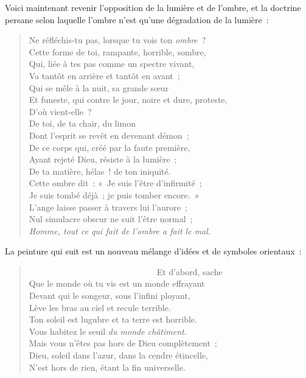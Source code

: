 \documentclass[french,twoside]{book} %
\begin{document}
\noindent Voici maintenant revenir l’opposition de la lumière et de l’ombre, et la doctrine persane selon laquelle l’ombre n’est qu’une dégradation de la lumière :\par


\begin{verse}
Ne réfléchis-tu pas, lorsque tu vois ton \emph{ombre} ?\\
Cette forme de toi, rampante, horrible, sombre,\\
Qui, liée à tes pas comme un spectre vivant,\\
Va tantôt en arrière et tantôt en avant ;\\
Qui se mêle à la nuit, sa grande sœur\\
Et funeste, qui contre le jour, noire et dure, proteste,\\
D’où vient-elle ?\\
De toi, de ta chair, du limon\\
Dont l’esprit se revêt en devenant démon ;\\
De ce corps qui, créé par la faute première,\\
Ayant rejeté Dieu, résiste à la lumière ;\\
De ta matière, hélas ! de ton iniquité.\\
Cette ombre dit : « Je suis l’être d’infirmité ;\\
Je suis tombé déjà ; je puis tomber encore. »\\
L’ange laisse passer à travers lui l’aurore ;\\
Nul simulacre obscur ne suit l’être normal ;\\
\emph{Homme, tout ce qui fait de l’ombre a fait le mal}.\\
\end{verse}

\noindent La peinture qui suit est un nouveau mélange d’idées et de symboles orientaux :\par


\begin{verse}
                               Et d’abord, sache\\
Que le monde où tu vis est un monde effrayant\\
Devant qui le songeur, sous l’infini ployant,\\
Lève les bras au ciel et recule terrible.\\
Ton soleil est lugubre et ta terre est horrible.\\
Vous habitez le seuil \emph{du monde châtiment}.\\
Mais vous n’êtes pas hors de Dieu complètement ;\\
Dieu, soleil dans l’azur, dans la cendre étincelle,\\
N’est hors de rien, étant la fin universelle.\\
\end{verse}
\end{document}
